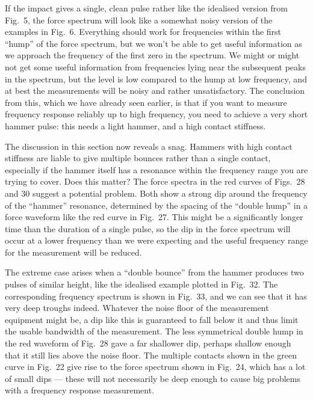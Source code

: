   If the impact gives a single, clean pulse rather like the idealised version 
  from Fig.\ 5, the force spectrum will look like a somewhat noisy version of 
  the examples in Fig.\ 6. Everything should work for frequencies within the 
  first “hump” of the force spectrum, but we won’t be able to get useful 
  information as we approach the frequency of the first zero in the spectrum. 
  We might or might not get some useful information from frequencies lying near 
  the subsequent peaks in the spectrum, but the level is low compared to the 
  hump at low frequency, and at best the measurements will be noisy and rather 
  unsatisfactory. The conclusion from this, which we have already seen earlier, 
  is that if you want to measure frequency response reliably up to high 
  frequency, you need to achieve a very short hammer pulse: this needs a light 
  hammer, and a high contact stiffness. 

  The discussion in this section now reveals a snag. Hammers with high contact 
  stiffness are liable to give multiple bounces rather than a single contact, 
  especially if the hammer itself has a resonance within the frequency range 
  you are trying to cover. Does this matter? The force spectra in the red 
  curves of Figs.\ 28 and 30 suggest a potential problem. Both show a strong 
  dip around the frequency of the “hammer” resonance, determined by the spacing 
  of the “double hump” in a force waveform like the red curve in Fig.\ 27. This 
  might be a significantly longer time than the duration of a single pulse, so 
  the dip in the force spectrum will occur at a lower frequency than we were 
  expecting and the useful frequency range for the measurement will be reduced. 

  The extreme case arises when a “double bounce” from the hammer produces two 
  pulses of similar height, like the idealised example plotted in Fig.\ 32. The 
  corresponding frequency spectrum is shown in Fig.\ 33, and we can see that it 
  has very deep troughs indeed. Whatever the noise floor of the measurement 
  equipment might be, a dip like this is guaranteed to fall below it and thus 
  limit the usable bandwidth of the measurement. The less symmetrical double 
  hump in the red waveform of Fig.\ 28 gave a far shallower dip, perhaps 
  shallow enough that it still lies above the noise floor. The multiple 
  contacts shown in the green curve in Fig.\ 22 give rise to the force spectrum 
  shown in Fig.\ 24, which has a lot of small dips --- these will not 
  necessarily be deep enough to cause big problems with a frequency response 
  measurement. 

